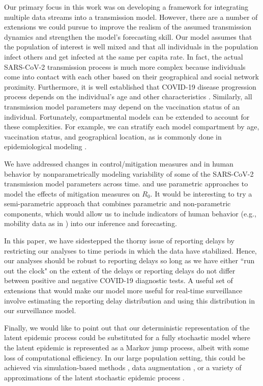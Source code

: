 Our primary focus in this work was on developing a framework for integrating multiple data streams into a transmission model.
However, there are a number of extensions we could pursue to improve the realism of the assumed transmission dynamics and strengthen the model's forecasting skill.
Our model assumes that the population of interest is well mixed and that all individuals in the population infect others and get infected at the same per capita rate.
In fact, the actual SARS-CoV-2 transmission process is much more complex because individuals come into contact with each other based on their geographical and social network proximity.
Furthermore, it is well established that COVID-19 disease progression process depends on the individual's age and other characteristics \citep{kim2020risk,bhargava2020predictors, petrilli2020factors}.
Similarly, all transmission model parameters may depend on the vaccination status of an individual.
Fortunately, compartmental models can be extended to account for these complexities.
For example, we can stratify each model compartment by age, vaccination status, and geographical location, as is commonly done in epidemiological modeling \citep{li2008continuous, van2008spatial}.
\par
We have addressed changes in control/mitigation measures and in human behavior by nonparametrically modeling variability of some of the SARS-CoV-2 transmission model parameters across time.
\citet{anderson2020} and \citet{miller2020} use parametric approaches to model the effects of mitigation measures on $R_0$.
It would be interesting to try a semi-parametric approach that combines parametric and non-parametric components, which would allow us to include indicators of human behavior (e.g., mobility data as in \citet{miller2020}) into our inference and forecasting.
\par
In this paper, we have sidestepped the thorny issue of reporting delays by restricting our analyses to time periods in which the data have stabilized.
Hence, our analyses should be robust to reporting delays so long as we have either ``run out the clock" on the extent of the delays or reporting delays do not differ between positive and negative COVID-19 diagnostic tests. A useful set of extensions that would make our model more useful for real-time surveillance involve estimating the reporting delay distribution \citep{hohle2014bayesian,stoner2019multivariate} and using this distribution in our surveillance model.
\par
Finally, we would like to point out that our deterministic representation of the latent epidemic process could be substituted for a fully stochastic model where the latent epidemic is represented as a Markov jump process, albeit with some loss of computational efficiency. In our large population setting, this could be achieved via simulation-based methods \citep{breto2009time, andrieu2010particle,dukic2012tracking}, data augmentation \citep{pooley2015using,nguyen2021stochastic}, or a variety of approximations of the latent stochastic epidemic process \citep{lekone2006statistical,cauchemez2008likelihood,fintzi2020linear}.
